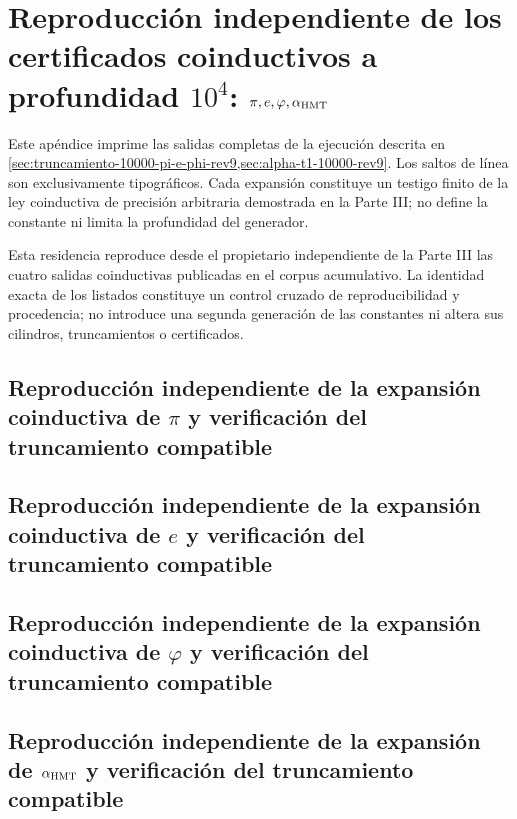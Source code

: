 \chapter{Reproducción independiente de los certificados coinductivos a profundidad \texorpdfstring{\(10^4\)}{10^4}: \texorpdfstring{\(\pi,e,\varphi,\alpha_{\rm HMT}\)}{pi, e, phi, alpha HMT}}
\label{app:desarrollos-10000-rev9-p3-procedencia}

Este apéndice imprime las salidas completas de la ejecución descrita en
\cref{sec:truncamiento-10000-pi-e-phi-rev9,sec:alpha-t1-10000-rev9}. Los
saltos de línea son exclusivamente tipográficos. Cada expansión constituye
un testigo finito de la ley coinductiva de precisión arbitraria demostrada en
la Parte III; no define la constante ni limita la profundidad del generador.

\begingroup
\lstset{basicstyle=\ttfamily\tiny,breaklines=true,breakatwhitespace=false,
  frame=single,columns=fullflexible,keepspaces=true,numbers=none}

Esta residencia reproduce desde el propietario independiente de la Parte III
las cuatro salidas coinductivas publicadas en el corpus acumulativo. La
identidad exacta de los listados constituye un control cruzado de
reproducibilidad y procedencia; no introduce una segunda generación de las
constantes ni altera sus cilindros, truncamientos o certificados.

\section{Reproducción independiente de la expansión coinductiva de \(\pi\) y verificación del truncamiento compatible}


\section{Reproducción independiente de la expansión coinductiva de \(e\) y verificación del truncamiento compatible}


\section{Reproducción independiente de la expansión coinductiva de \(\varphi\) y verificación del truncamiento compatible}


\enlargethispage{\baselineskip}
\section{Reproducción independiente de la expansión de \texorpdfstring{\(\alpha_{\rm HMT}\)}{alpha HMT} y verificación del truncamiento compatible}

\endgroup

